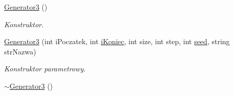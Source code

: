 \begin{DoxyCompactItemize}
\item 
\hypertarget{classGenerator3_a6817e5557639442bef9bc31993b8ba59}{\hyperlink{classGenerator3_a6817e5557639442bef9bc31993b8ba59}{Generator3} ()}\label{classGenerator3_a6817e5557639442bef9bc31993b8ba59}

\begin{DoxyCompactList}\small\item\em Konstruktor. \end{DoxyCompactList}\item 
\hyperlink{classGenerator3_a09577a1241a84b682f2b0a8fab79a04c}{Generator3} (int i\+Poczatek, int \hyperlink{classGenerator_a235b3d02ce62d19e803cc2295eb7911e}{i\+Koniec}, int size, int step, int \hyperlink{classGenerator_ae77446ccb4946b8eb28d0f20f3e4a95f}{seed}, string str\+Nazwa)
\begin{DoxyCompactList}\small\item\em Konstruktor parametrowy. \end{DoxyCompactList}\item 
\hypertarget{classGenerator3_a031ad6458f193c019538bc890fd57e88}{\hyperlink{classGenerator3_a031ad6458f193c019538bc890fd57e88}{$\sim$\+Generator3} ()}\label{classGenerator3_a031ad6458f193c019538bc890fd57e88}


\end{DoxyCompactItemize}
